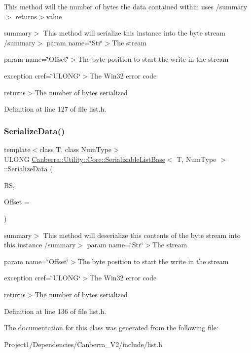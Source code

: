 This method will the number of bytes the data contained within uses /summary$>$ returns$>$value

summary$>$ This method will serialize this instance into the byte stream /summary$>$ param name=\char`\"{}\+Str\char`\"{}$>$The stream

param name=\char`\"{}\+Offset\char`\"{}$>$The byte position to start the write in the stream

exception cref=\char`\"{}\+U\+L\+O\+N\+G\char`\"{}$>$The Win32 error code

returns$>$The number of bytes serialized

Definition at line 127 of file list.\+h.

\mbox{\label{class_canberra_1_1_utility_1_1_core_1_1_serializable_list_base_a4a6021089fa90d9534541e6093972970_a4a6021089fa90d9534541e6093972970}} 
\subsubsection{\texorpdfstring{Serialize\+Data()}{SerializeData()}}
{\footnotesize\ttfamily template$<$class T, class Num\+Type$>$ \\
U\+L\+O\+NG \hyperlink{class_canberra_1_1_utility_1_1_core_1_1_serializable_list_base}{Canberra\+::\+Utility\+::\+Core\+::\+Serializable\+List\+Base}$<$ T, Num\+Type $>$\+::Serialize\+Data (\begin{DoxyParamCaption}\item[{\hyperlink{class_canberra_1_1_utility_1_1_core_1_1_byte_stream}{Canberra\+::\+Utility\+::\+Core\+::\+Byte\+Stream} \&}]{BS,  }\item[{U\+L\+O\+NG}]{Offset = {} }\end{DoxyParamCaption})\hspace{0.3cm}{\ttfamily [inline]}}

summary$>$ This method will deserialize this contents of the byte stream into this instance /summary$>$ param name=\char`\"{}\+Str\char`\"{}$>$The stream

param name=\char`\"{}\+Offset\char`\"{}$>$The byte position to start the write in the stream

exception cref=\char`\"{}\+U\+L\+O\+N\+G\char`\"{}$>$The Win32 error code

returns$>$The number of bytes serialized

Definition at line 136 of file list.\+h.



The documentation for this class was generated from the following file\+:\begin{DoxyCompactItemize}
\item 
Project1/\+Dependencies/\+Canberra\+\_\+\+V2/include/list.\+h\end{DoxyCompactItemize}
